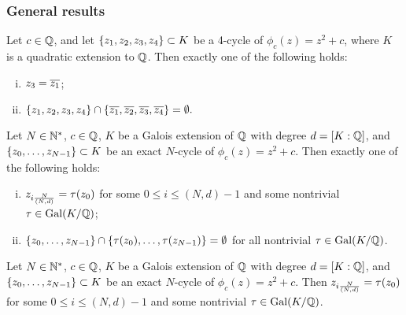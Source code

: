 \documentclass[aspectratio=1610]{beamer}
\begin{document}
\begin{frame}
  \frametitle{General results}

  \pause

  \begin{lemma} 
    Let $c \in \mathbb{Q}$, and let $\left\{z_1, z_2, z_3, z_4\right\} \subset K$ be a
    4-cycle of $\phi_c(z) = z^2 + c$, where $K$ is a quadratic
    extension to $\mathbb{Q}$. Then exactly one of the following holds:
    \begin{enumerate}[(i)]
    \item $z_3 = \overline{z_1}$;

    \item $\{z_1, z_2, z_3, z_4\} \cap \{\overline{z_1}, \overline{z_2}, \overline{z_3},
      \overline{z_4}\} =\emptyset.$
    \end{enumerate}
  \end{lemma}

  \pause

  \begin{htheorem}
    Let $N \in \mathbb{N}^*$, $c \in \mathbb{Q}$, $K$ be a Galois extension of $\mathbb{Q}$
    with degree $d = [K : \mathbb{Q}]$, and $\left\{z_0, \dots, z_{N-1}\right\} \subset
    K$ be an exact $N$-cycle of $\phi_c(z) = z^2 + c$. Then exactly
    one of the following holds:
    \begin{enumerate}[(i)]
    \item $z_{i\frac{N}{(N, d)}} = \tau(z_0)$ for some $0 \le i \le (N, d)-1$ and
      some nontrivial $\tau \in \mathrm{Gal}(K/\mathbb{Q})$;

    \item $\left\{z_0, \dots, z_{N-1}\right\} \cap \left\{\tau(z_0), \dots,
        \tau(z_{N-1})\right\} = \emptyset$ for all nontrivial $\tau \in \mathrm{Gal}(K/\mathbb{Q})$.
    \end{enumerate}
  \end{htheorem}

  \pause

  \begin{hconjecture}
    \label{cj:galois-conjugate}
    Let $N \in \mathbb{N}^*$, $c \in \mathbb{Q}$, $K$ be a Galois extension of $\mathbb{Q}$
    with degree $d = [K : \mathbb{Q}]$, and $\left\{z_0, \dots, z_{N-1}\right\} \subset
    K$ be an exact $N$-cycle of $\phi_c(z) = z^2 + c$. Then $z_{i\frac{N}{(N, d)}}
    = \tau(z_0)$ for some $0 \le i \le (N, d)-1$ and some nontrivial $\tau
    \in \mathrm{Gal}(K/\mathbb{Q})$.
  \end{hconjecture}
\end{frame}
\end{document}
